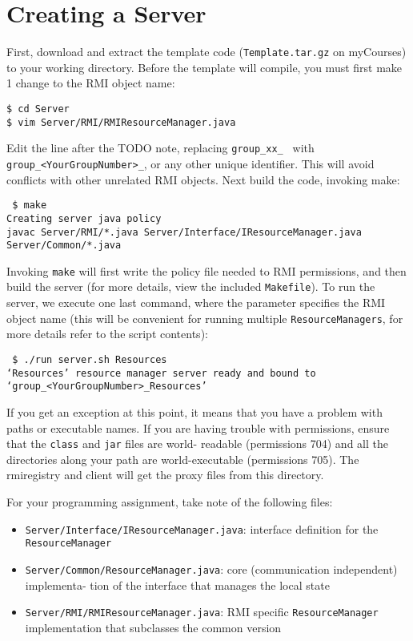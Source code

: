 \documentclass[11pt]{article}
\begin{document}
\section*{Creating a Server}

First, download and extract the template code (\texttt{Template.tar.gz} on myCourses) to your working directory. Before the template will compile, you must first make 1 change to the RMI object name:

\texttt{\$ cd Server\\
\$ vim Server/RMI/RMIResourceManager.java}

Edit the line after the TODO note, replacing \texttt{group\_xx\_ } with \texttt{group\_<YourGroupNumber>\_}, or any other unique identifier. This will avoid conflicts with other unrelated RMI objects. Next build the code, invoking make:

\texttt{
\$ make \\
Creating server java policy\\
javac Server/RMI/*.java Server/Interface/IResourceManager.java Server/Common/*.java\\
}

Invoking \texttt{make} will first write the policy file needed to RMI permissions, and then build the server (for more details, view the included \texttt{Makefile}). To run the server, we execute one last command, where the parameter specifies the RMI object name (this will be convenient for running multiple \texttt{ResourceManagers}, for more details refer to the script contents):

\texttt{
\$ ./run server.sh Resources\\
`Resources' resource manager server ready and bound to `group\_<YourGroupNumber>\_Resources'
}

If you get an exception at this point, it means that you have a problem with paths or executable names. If you are having trouble with permissions, ensure that the \texttt{class} and \texttt{jar} files are world- readable (permissions 704) and all the directories along your path are world-executable (permissions 705). The rmiregistry and client will get the proxy files from this directory.

For your programming assignment, take note of the following files:

\begin{itemize}
				\item \texttt{Server/Interface/IResourceManager.java}: interface definition for the \texttt{ResourceManager}
				\item \texttt{Server/Common/ResourceManager.java}: core (communication independent) implementa- tion of the interface that manages the local state
				\item \texttt{Server/RMI/RMIResourceManager.java}: RMI specific \texttt{ResourceManager} implementation that subclasses the common version
\end{itemize}
\end{document}
